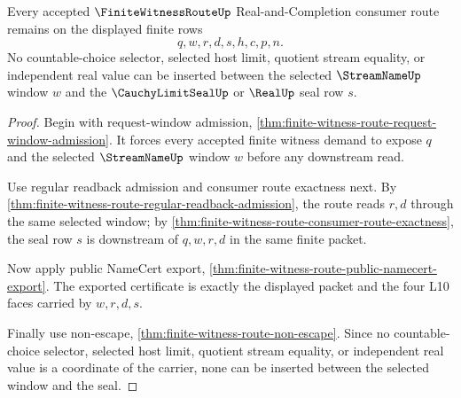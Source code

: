 \begin{theorem}
\label{thm:finite-witness-route-choice-refusal-boundary}
Every accepted $\FiniteWitnessRouteUp$ Real-and-Completion consumer route remains on the displayed finite rows
$$
q,w,r,d,s,h,c,p,n.
$$
No countable-choice selector, selected host limit, quotient stream equality, or independent real value can be inserted between the selected $\StreamNameUp$ window $w$ and the $\CauchyLimitSealUp$ or $\RealUp$ seal row $s$.
\end{theorem}
\begin{proof}
Begin with request-window admission, \autoref{thm:finite-witness-route-request-window-admission}. It forces every accepted finite witness demand to expose $q$ and the selected $\StreamNameUp$ window $w$ before any downstream read.

Use regular readback admission and consumer route exactness next. By \autoref{thm:finite-witness-route-regular-readback-admission}, the route reads $r,d$ through the same selected window; by \autoref{thm:finite-witness-route-consumer-route-exactness}, the seal row $s$ is downstream of $q,w,r,d$ in the same finite packet.

Now apply public NameCert export, \autoref{thm:finite-witness-route-public-namecert-export}. The exported certificate is exactly the displayed packet and the four L10 faces carried by $w,r,d,s$.

Finally use non-escape, \autoref{thm:finite-witness-route-non-escape}. Since no countable-choice selector, selected host limit, quotient stream equality, or independent real value is a coordinate of the carrier, none can be inserted between the selected window and the seal.
\end{proof}


